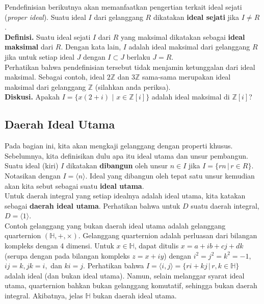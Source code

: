 	Pendefinisian berikutnya akan memanfaatkan pengertian terkait ideal sejati (\textit{proper ideal}). Suatu ideal $I$ dari gelanggang $R$ dikatakan \textbf{ideal sejati} jika $I \ne R$.\\
	
	\textbf{Definisi. }Suatu ideal sejati $I$ dari $R$ yang maksimal dikatakan sebagai \textbf{ideal maksimal} dari $R$. Dengan kata lain, $I$ adalah ideal maksimal dari gelanggang $R$ jika untuk setiap ideal $J$ dengan $I \subset J$ berlaku $J = R$.\\
	
	Perhatikan bahwa pendefinisian tersebut tidak menjamin ketunggalan dari ideal maksimal. Sebagai contoh, ideal $2\mathbb{Z}$ dan $3\mathbb{Z}$ sama-sama merupakan ideal maksimal dari gelanggang $\mathbb{Z}$ (silahkan anda periksa).
	\\
	
	\textbf{Diskusi.} Apakah $I = \{ x(2+i) \, \, | \, \, x \in \mathbb{Z}[i] \}$ adalah ideal maksimal di $\mathbb{Z}[i]$?
	\subsection{Daerah Ideal Utama}
	Pada bagian ini, kita akan mengkaji gelanggang dengan properti khusus. Sebelumnya, kita definisikan dulu apa itu ideal utama dan unsur pembangun. Suatu ideal (kiri) $I$ dikatakan \textbf{dibangun} oleh unsur $n \in I$ jika $I = \{rn \, | \, r \in R\}$. Notasikan dengan $I = \langle n \rangle$. Ideal yang dibangun oleh tepat satu unsur kemudian akan kita sebut sebagai suatu \textbf{ideal utama}.
	\\
	
	Untuk daerah integral yang setiap idealnya adalah ideal utama, kita katakan sebagai \textbf{daerah ideal utama}. Perhatikan bahwa untuk $D$ suatu daerah integral, $D = \langle 1 \rangle$.\\
	
	Contoh gelanggang yang bukan daerah ideal utama adalah gelanggang quarternion $(\mathbb{H},+,\times)$. Gelanggang quarternion adalah perluasan dari bilangan kompleks dengan 4 dimensi. Untuk $x \in \mathbb{H}$, dapat ditulis $x = a + ib + cj + dk$ (serupa dengan pada bilangan kompleks $z = x + iy$) dengan $i^2 = j^2 = k^2 = -1$, $ij = k, jk = i,$ dan $ki = j$. Perhatikan bahwa $I = \langle i,j \rangle = \{ri + kj \, | \, r,k \in \mathbb{H}\}$ adalah ideal (dan bukan ideal utama). Namun, selain melanggar syarat ideal utama, quarternion bahkan bukan gelanggang komutatif, sehingga bukan daerah integral. Akibatnya, jelas $\mathbb{H}$ bukan daerah ideal utama.
	\\
	
